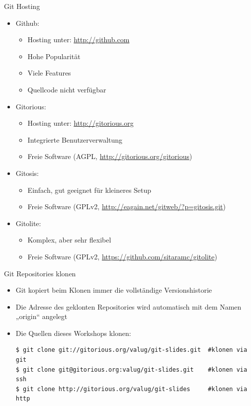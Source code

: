 \begin{frame}[allowframebreaks]{Git Hosting}
  \begin{itemize}
    \item Github:
    \begin{itemize}
      \item Hosting unter: \url{http://github.com}
      \item Hohe Popularität
      \item Viele Features
      \item Quellcode nicht verfügbar
    \end{itemize}
    \item Gitorious:
    \begin{itemize}
      \item Hosting unter: \url{http://gitorious.org}
      \item Integrierte Benutzerverwaltung
      \item Freie Software (AGPL, \url{http://gitorious.org/gitorious})
    \end{itemize}
  \framebreak
    \item Gitosis:
    \begin{itemize}
      \item Einfach, gut geeignet für kleineres Setup
      \item Freie Software (GPLv2, \url{http://eagain.net/gitweb/?p=gitosis.git})
    \end{itemize}
    \item Gitolite:
    \begin{itemize}
      \item Komplex, aber sehr flexibel
      \item Freie Software (GPLv2, \url{https://github.com/sitaramc/gitolite})
    \end{itemize}
  \end{itemize}
\end{frame}

\begin{frame}[fragile]{Git Repositories klonen}
  \begin{itemize}
    \item Git kopiert beim Klonen immer die vollständige Versionshistorie
    \item Die Adresse des geklonten Repositories wird automatisch mit dem Namen „origin“ angelegt
    \item Die Quellen dieses Workshops klonen:
    \begin{lstlisting}
$ git clone git://gitorious.org/valug/git-slides.git  #klonen via git
$ git clone git@gitorious.org:valug/git-slides.git    #klonen via ssh
$ git clone http://gitorious.org/valug/git-slides     #klonen via http
    \end{lstlisting}
  \end{itemize}
\end{frame}

